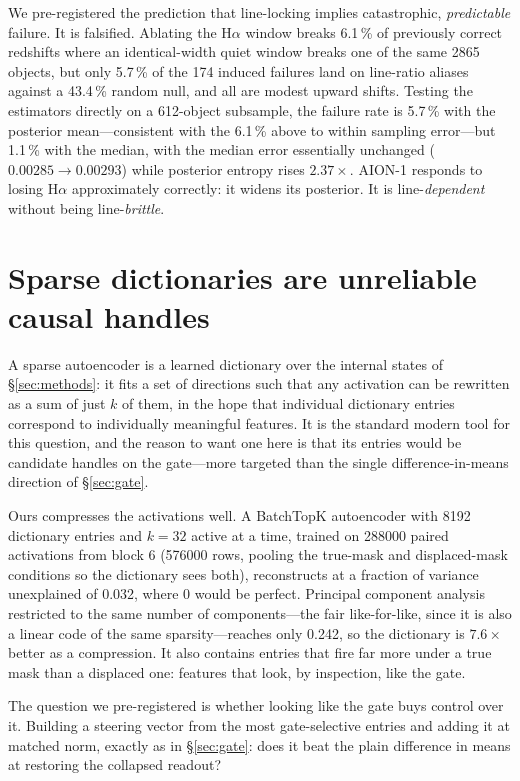 \documentclass[11pt]{article}
\newcommand{\aion}{AION-1}
\begin{document}
We pre-registered the prediction that line-locking implies catastrophic, \emph{predictable}
failure. It is falsified. Ablating the H$\alpha$ window breaks 6.1\,\% of previously correct
redshifts where an identical-width quiet window breaks one of the same 2865 objects, but only 5.7\,\% of
the 174 induced failures land on line-ratio aliases against a 43.4\,\% random null, and all are
modest upward shifts. Testing the estimators directly on a 612-object subsample, the failure
rate is 5.7\,\% with the posterior mean---consistent with the 6.1\,\% above to within sampling
error---but 1.1\,\% with the median, with the median error essentially unchanged
($0.00285\rightarrow0.00293$) while posterior entropy rises $2.37\times$. \aion{} responds to
losing H$\alpha$ approximately correctly: it widens its posterior. It is line-\emph{dependent}
without being line-\emph{brittle}.

\section{Sparse dictionaries are unreliable causal handles}
\label{sec:sae}

A sparse autoencoder is a learned dictionary over the internal states of \S\ref{sec:methods}:
it fits a set of directions such that any activation can be rewritten as a sum of just $k$ of
them, in the hope that individual dictionary entries correspond to individually meaningful
features. It is the standard modern tool for this question, and the reason to want one here is
that its entries would be candidate handles on the gate---more targeted than the single
difference-in-means direction of \S\ref{sec:gate}.

Ours compresses the activations well. A BatchTopK autoencoder
\citep{bussmann2024batchtopk} with 8192 dictionary entries and $k=32$ active at a time, trained
on \num{288000} paired activations from block 6 (\num{576000} rows, pooling the true-mask and
displaced-mask conditions so the dictionary sees both), reconstructs at a fraction of variance
unexplained of 0.032, where 0 would be perfect. Principal component analysis restricted to the
same number of components---the fair like-for-like, since it is also a linear code of the same
sparsity---reaches only 0.242, so the dictionary is $7.6\times$ better as a compression. It also
contains entries that fire far more under a true mask than a displaced one: features that look,
by inspection, like the gate.

The question we pre-registered is whether looking like the gate buys control over it. Building a
steering vector from the most gate-selective entries and adding it at matched norm, exactly as
in \S\ref{sec:gate}: does it beat the plain difference in means at restoring the collapsed
readout?
\end{document}
